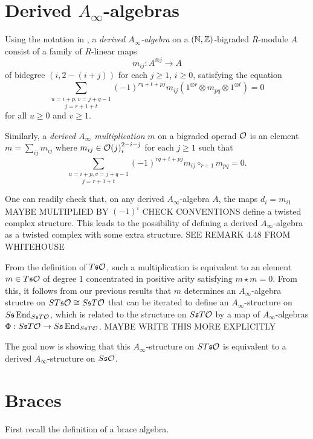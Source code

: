 \documentclass[twoside]{article}
\begin{document}
\section{Derived $A_\infty$-algebras}
  \begin{definition}
  Using the notation in \cite{RW}, a \emph{derived $A_\infty$-algebra} on a $(\mathbb{N},\mathbb{Z})$-bigraded $R$-module $A$ consist of a family of $R$-linear maps 
\[m_{ij}:A^{\otimes j}\to A\]
of bidegree $(i,2-(i+j))$ for each $j\geq 1$, $i\geq 0$, satisfying the equation
\[\underset{j=r+1+t}{\sum_{u=i+p, v=j+q-1}}(-1)^{rq+t+pj}m_{ij}(1^{\otimes r}\otimes m_{pq}\otimes 1^{\otimes t})=0\]
for all $u\geq 0$ and $v\geq 1$. 


Similarly, a \emph{derived $A_\infty$ multiplication} $m$ on a bigraded operad ${\mathcal O}$ is an element $m=\sum_{ij}m_{ij}$ where $m_{ij}\in{\mathcal O}(j)^{2-i-j}_i$ for each $j\geq 1$ such that 
\[\underset{j=r+1+t}{\sum_{u=i+p, v=j+q-1}}(-1)^{rq+t+pj}m_{ij}\circ_{r+1} m_{pq}=0.\]
\end{definition}
\begin{remark}
One can readily check that, on any derived $A_\infty$-algebra $A$, the maps $d_i=m_{i1}$ MAYBE MULTIPLIED BY $(-1)^i$ CHECK CONVENTIONS define a twisted complex structure. This leads to the possibility of defining a derived $A_\infty$-algebra as a twisted complex with some extra structure. SEE  REMARK 4.48 FROM WHITEHOUSE
\end{remark}
From the definition of $T\mathfrak{s}{\mathcal O}$, such a multiplication is equivalent to an element $m\in T\mathfrak{s}{\mathcal O}$ of degree 1 concentrated in positive arity satisfying $m\star m=0$. From this, it follows from our previous results that $m$ determines an $A_\infty$-algebra structre on $ST\mathfrak{s}{\mathcal O}\cong S\mathfrak{s} T{\mathcal O}$ %
that can be iterated to define an $A_\infty$-structure on $S\mathfrak{s}\operatorname{End}_{S\mathfrak{s} T{\mathcal O}}$, which is related to the structure on $S\mathfrak{s} T{\mathcal O}$ by a map of $A_\infty$-algebras  $\Phi:S\mathfrak{s} T{\mathcal O}
\to  S\mathfrak{s}\operatorname{End}_{S\mathfrak{s} T{\mathcal O}}$.  MAYBE WRITE THIS MORE EXPLICITLY 

The goal now is showing that this $A_\infty$-structure on $ST\mathfrak{s}{\mathcal O}$ is equivalent to a derived $A_\infty$-structure on $S\mathfrak{s} {\mathcal O}$. 


\section{Braces}\label{sectionbraces}
First recall the definition of a brace algebra.
\end{document}
